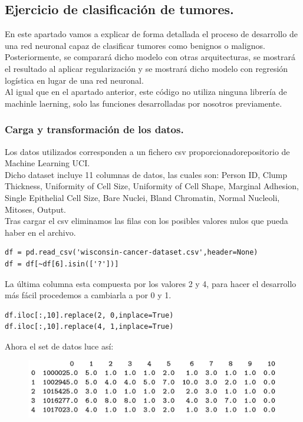 \documentclass[a4paper,11pt]{article}
\begin{document}
\subsection{Ejercicio de clasificación de tumores.}
En este apartado vamos a explicar de forma detallada el proceso de desarrollo de una red neuronal capaz de clasificar tumores como benignos o malignos.\\

\noindent
Posteriormente, se comparará dicho modelo con otras arquitecturas, se mostrará el resultado al aplicar regularización y se mostrará dicho modelo con regresión logística en lugar de una red neuronal. \\

\noindent
Al igual que en el apartado anterior, este código no utiliza ninguna librería de machinle laerning, solo las funciones desarrolladas por nosotros previamente.
\subsubsection{Carga y transformación de los datos.}
Los datos utilizados corresponden a un fichero csv proporcionadorepositorio de Machine Learning UCI.\\

\noindent
Dicho dataset incluye 11 columnas de datos, las cuales son: Person ID, Clump Thickness, Uniformity of Cell Size, Uniformity of Cell Shape, Marginal Adhesion, Single Epithelial Cell Size, Bare Nuclei, Bland Chromatin, Normal Nucleoli, Mitoses, Output.\\

\noindent
Tras cargar el csv eliminamos las filas con los posibles valores nulos que pueda haber en el archivo.
\begin{lstlisting}
df = pd.read_csv('wisconsin-cancer-dataset.csv',header=None)
df = df[~df[6].isin(['?'])]
\end{lstlisting}
La última columna esta compuesta por los valores 2 y 4,  para hacer el desarrollo más fácil procedemos a cambiarla a por 0 y 1.
\begin{lstlisting}
df.iloc[:,10].replace(2, 0,inplace=True)
df.iloc[:,10].replace(4, 1,inplace=True)
\end{lstlisting}
Ahora el set de datos luce así: 
\begin{figure}[H]
\centering
\includegraphics{Annotation 2020-03-23 185932.png}
\end{figure}
\end{document}
